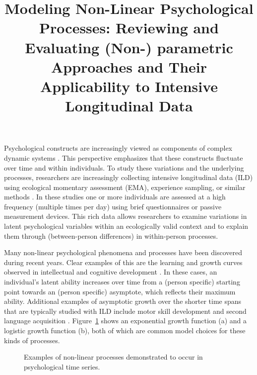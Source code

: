 \documentclass[man, floatsintext]{apa7}
\title{Modeling Non-Linear Psychological Processes: Reviewing and Evaluating
  (Non-) parametric Approaches and Their Applicability to Intensive
  Longitudinal
  Data}
\begin{document}
\maketitle

Psychological constructs are increasingly viewed as components of complex
dynamic systems \parencite{nesselroade_studying_2004, wang_investigating_2012}.
This perspective emphasizes that these constructs fluctuate over time and
within individuals. To study these variations and the underlying processes,
researchers are increasingly collecting intensive longitudinal data (ILD) using
ecological momentary assessment (EMA), experience sampling, or similar methods
\parencite{fritz_so_2023}. In these studies one or more individuals are
assessed at a high frequency (multiple times per day) using brief
questionnaires or passive measurement devices. This rich data allows
researchers to examine variations in latent psychological variables
within an ecologically valid context and to explain them through
(between-person differences) in within-person processes.

Many non-linear psychological phenomena and processes have been discovered
during recent years. Clear examples of this are the learning and growth curves
observed in intellectual and cognitive development
\parencite{kunnen_dynamic_2012, mcardle_comparative_2002}. In these cases, an
individual's latent ability increases over time from a (person specific)
starting point towards an (person specific) asymptote, which reflects their
maximum ability. Additional examples of asymptotic growth over the shorter
time spans that are typically studied with ILD include
motor skill development \parencite{newell_time_2001} and second language
acquisition \parencite{de_bot_dynamic_2007}. Figure~\ref{fig:examplar_npn}
shows an exponential growth function (a) and a logistic growth function (b),
both of which are common model choices for these kinds of processes.

\begin{figure}[!ht]
  \caption{Examples of non-linear processes demonstrated to occur in
    psychological time series.}
  \label{fig:examplar_npn}
\end{figure}
\end{document}
